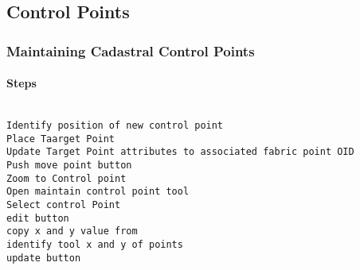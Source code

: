 \documentclass[class=article , crop=false, titlepage, twoside, multi={itemize, figure, verbatim}, float=false]{standalone}
\title{}  %
\begin{document}

\ifstandalone
\maketitle %
\tableofcontents %
\clearpage
\fi

\subsection{Control Points}
\medskip
\subsubsection[Editing Control Points]{Maintaining Cadastral Control Points}

\paragraph*{Steps}
\begin{verbatim}

Identify position of new control point
Place Taarget Point
Update Target Point attributes to associated fabric point OID
Push move point button
Zoom to Control point
Open maintain control point tool
Select control Point
edit button
copy x and y value from 
identify tool x and y of points
update button

\end{verbatim}
\end{document}
